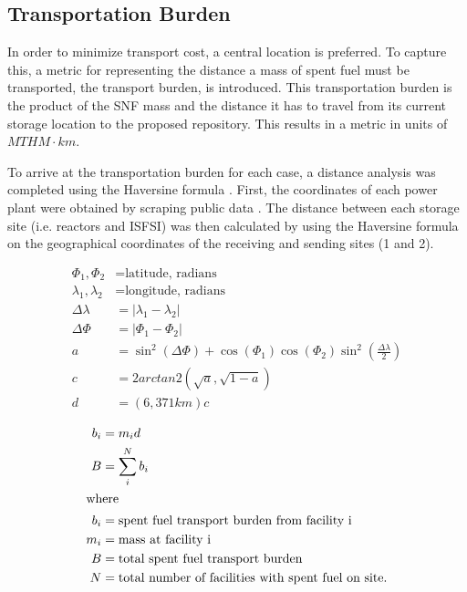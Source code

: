 \subsection{Transportation Burden}
 In order to minimize transport cost, a central location is preferred. To 
 capture this, a metric 
 for representing the distance a mass of spent fuel must be transported, the 
 transport burden, is introduced. This transportation burden is the product 
 of the \gls{SNF} mass and the distance it has to travel from its current 
 storage location to the proposed repository. This results in a 
 metric in units of $MTHM\cdot km$. 

 To arrive at the transportation burden for each case, a distance analysis was 
 completed using the Haversine formula \cite{shumaker_astronomical_1984}. 
 First, the coordinates of each power plant were obtained by scraping public 
 data \cite{wikipedia}.  The distance between each storage site (i.e. reactors 
 and \gls{ISFSI}) was then calculated by using the Haversine formula on the 
 geographical coordinates of the receiving and sending sites (1 and 2). 

 \begin{align} 
         \Phi_1,\Phi_2&= \mbox{latitude, radians}\\
         \lambda_1,\lambda_2 &= \mbox{longitude, radians}\\
         \Delta\lambda &= \left|\lambda_1 - \lambda_2\right|\\
         \Delta\Phi &= \left|\Phi_1 - \Phi_2\right|\\
         a&=\sin^2(\Delta\Phi)+\cos(\Phi_1)\cos(\Phi_2)\sin^2{\left(\frac{\Delta\lambda}{2}\right)}\\
         c &= 2arctan2(\sqrt{a},\sqrt{1-a})\\
         d &=  (6,371km)c
 \end{align}

\begin{align}
        b_i &= m_id\\
        B &= \sum_i^N b_i\\
        \intertext{where}
        b_i &= \mbox{spent fuel transport burden from facility i}\\
        m_i &= \mbox{mass at facility i}\\
        B &= \mbox{total spent fuel transport burden}\\
        N &= \mbox{total number of facilities with spent fuel on site.}
\end{align}

